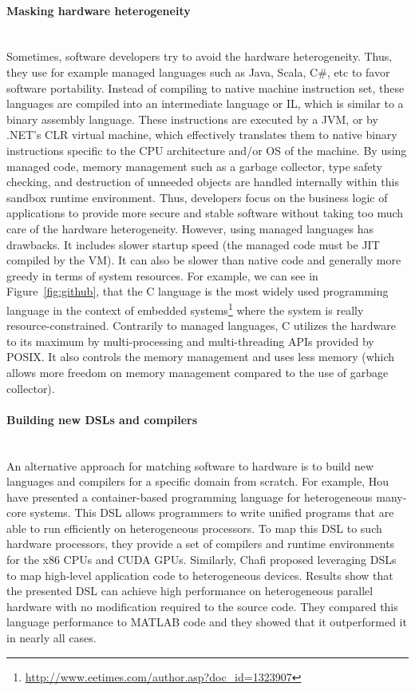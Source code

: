 \paragraph{Masking hardware heterogeneity}~\\ 
Sometimes, software developers try to avoid the hardware heterogeneity. Thus, they use for example managed languages such as Java, Scala, C\#, etc to favor software portability. Instead of compiling to native machine instruction set, these languages are compiled into an intermediate language or IL, which is similar to a binary assembly language. These instructions are executed by a JVM, or by .NET's CLR virtual machine, which effectively translates them to native binary instructions specific to the CPU architecture and/or OS of the machine.
By using managed code, memory management such as a garbage collector, type safety checking, and destruction of unneeded objects are handled internally within this sandbox runtime environment. Thus, developers focus on the business logic of applications to provide more secure and stable software without taking too much care of the hardware heterogeneity.
However, using managed languages has drawbacks. It includes slower startup speed (the managed code must be JIT compiled by the VM). It can also be slower than native code and generally more greedy in terms of system resources. 
For example, we can see in Figure~\ref{fig:github}, that the C language is the most widely used programming language in the context of embedded systems\footnote{\url{http://www.eetimes.com/author.asp?doc_id=1323907}} where the system is really resource-constrained. Contrarily to managed languages, C utilizes the hardware to its maximum by multi-processing and multi-threading APIs provided by POSIX. It also controls the memory management and uses less memory (which allows more freedom on memory management compared to the use of garbage collector).   


\paragraph{Building new DSLs and compilers}~\\ 
An alternative approach for matching software to hardware is to build new languages and compilers for a specific domain from scratch. 
For example, Hou \etal\cite{hou2010spap} have presented a container-based programming language for heterogeneous many-core systems. This DSL allows programmers to write unified programs that are able to run efficiently on heterogeneous processors. To map this DSL to such hardware processors, they provide a set of compilers and runtime environments for the x86 CPUs
and CUDA GPUs. Similarly, Chafi \etal\cite{chafi2010language,chafi2011domain} proposed leveraging DSLs to map high-level application code to heterogeneous devices. Results show that the presented DSL can achieve high performance on heterogeneous parallel hardware with no modification required to the source code. They compared this language performance to MATLAB code and they showed that it outperformed it in nearly all cases.

